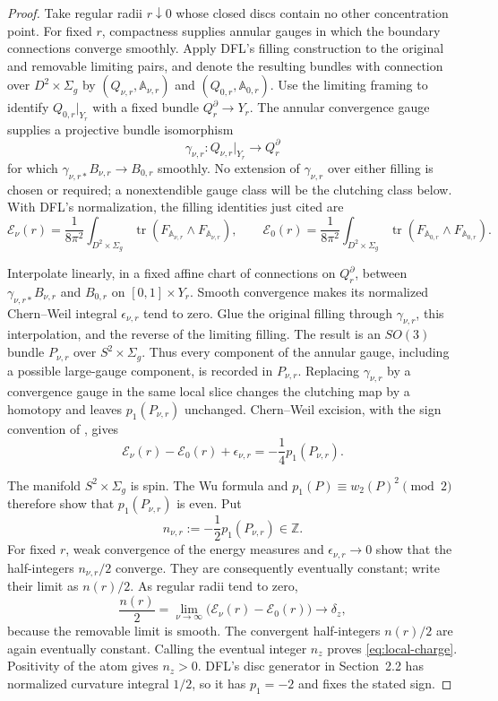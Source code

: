 \documentclass[11pt]{amsart}
\theoremstyle{definition}
\theoremstyle{remark}
\theoremstyle{plain}
\newcommand{\ZZ}{\mathbb{Z}}
\newcommand{\cE}{\mathcal{E}}
\newcommand{\tr}{\operatorname{tr}}
\begin{document}
\begin{proof}
Take regular radii $r\downarrow0$ whose closed discs contain no other
concentration point.  For fixed $r$, compactness supplies annular gauges in
which the boundary connections converge smoothly.  Apply DFL's filling
construction to the original and removable limiting pairs, and denote the
resulting bundles with connection over $D^2\times\Sigma_g$ by
$(Q_{\nu,r},\mathbb A_{\nu,r})$ and $(Q_{0,r},\mathbb A_{0,r})$.  Use the
limiting framing to identify $Q_{0,r}|_{Y_r}$ with a fixed bundle
$Q_r^\partial\to Y_r$.  The annular convergence gauge supplies a projective
bundle isomorphism
\[
 \gamma_{\nu,r}:Q_{\nu,r}|_{Y_r}\longrightarrow Q_r^\partial
\]
for which $\gamma_{\nu,r*}B_{\nu,r}\to B_{0,r}$ smoothly.  No extension of
$\gamma_{\nu,r}$ over either filling is chosen or required; a nonextendible
gauge class will be the clutching class below.  With
DFL's normalization, the filling identities just cited are
\[
 \cE_\nu(r)=\frac{1}{8\pi^2}
   \int_{D^2\times\Sigma_g}\tr(F_{\mathbb A_{\nu,r}}\wedge
                                      F_{\mathbb A_{\nu,r}}),
 \qquad
 \cE_0(r)=\frac{1}{8\pi^2}
   \int_{D^2\times\Sigma_g}\tr(F_{\mathbb A_{0,r}}\wedge
                                      F_{\mathbb A_{0,r}}).
\]

Interpolate linearly, in a fixed affine chart of connections on
$Q_r^\partial$, between $\gamma_{\nu,r*}B_{\nu,r}$ and $B_{0,r}$ on
$[0,1]\times Y_r$.  Smooth convergence makes its normalized Chern--Weil
integral $\epsilon_{\nu,r}$ tend to zero.  Glue the original filling through
$\gamma_{\nu,r}$, this interpolation, and the reverse of the limiting
filling.  The result is an $SO(3)$ bundle $P_{\nu,r}$ over
$S^2\times\Sigma_g$.  Thus every component of the annular gauge, including
a possible large-gauge component, is recorded in $P_{\nu,r}$.  Replacing
$\gamma_{\nu,r}$ by a convergence gauge in the same local slice changes the
clutching map by a homotopy and leaves $p_1(P_{\nu,r})$ unchanged.
Chern--Weil excision,
with the sign convention of \cite[Proposition~5.14]{DaeFukLip21a}, gives
\begin{equation}\label{eq:relative-p1}
 \cE_\nu(r)-\cE_0(r)+\epsilon_{\nu,r}
       =-\frac14p_1(P_{\nu,r}).
\end{equation}

The manifold $S^2\times\Sigma_g$ is spin.  The Wu formula and
$p_1(P)\equiv w_2(P)^2\pmod2$ therefore show that $p_1(P_{\nu,r})$ is
even.  Put
\[
                    n_{\nu,r}:=-\frac12p_1(P_{\nu,r})\in\ZZ.
\]
For fixed $r$, weak convergence of the energy measures and
$\epsilon_{\nu,r}\to0$ show that the half-integers $n_{\nu,r}/2$ converge.
They are consequently eventually constant; write their limit as $n(r)/2$.
As regular radii tend to zero,
\[
 \frac{n(r)}2
 =\lim_{\nu\to\infty}\bigl(\cE_\nu(r)-\cE_0(r)\bigr)
 \longrightarrow\delta_z,
\]
because the removable limit is smooth.  The convergent half-integers
$n(r)/2$ are again eventually constant.  Calling the eventual integer
$n_z$ proves \eqref{eq:local-charge}.  Positivity of the atom gives
$n_z>0$.  DFL's disc generator in Section~2.2 has normalized curvature
integral $1/2$, so it has $p_1=-2$ and fixes the stated sign.


\end{proof}
\end{document}
